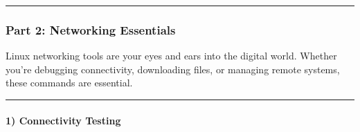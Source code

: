 \documentclass[
  english,
  paper=a4,
  oneside  ,captions=tableheading
]{scrartcl}
\newenvironment{Shaded}{}{}
\newcommand{\AttributeTok}[1]{\textcolor[rgb]{0.49,0.56,0.16}{#1}}
\newcommand{\BuiltInTok}[1]{\textcolor[rgb]{0.00,0.50,0.00}{#1}}
\newcommand{\CommentTok}[1]{\textcolor[rgb]{0.38,0.63,0.69}{\textit{#1}}}
\newcommand{\ExtensionTok}[1]{#1}
\newcommand{\KeywordTok}[1]{\textcolor[rgb]{0.00,0.44,0.13}{\textbf{#1}}}
\newcommand{\OperatorTok}[1]{\textcolor[rgb]{0.40,0.40,0.40}{#1}}
\newcommand{\StringTok}[1]{\textcolor[rgb]{0.25,0.44,0.63}{#1}}
\newcommand{\VariableTok}[1]{\textcolor[rgb]{0.10,0.09,0.49}{#1}}
\begin{document}
\begin{Shaded}
\end{Shaded}

\begin{center}\rule{0.5\linewidth}{0.5pt}\end{center}

\subsubsection{Part 2: Networking
Essentials}\label{part-2-networking-essentials}

Linux networking tools are your eyes and ears into the digital world.
Whether you're debugging connectivity, downloading files, or managing
remote systems, these commands are essential.

\begin{center}\rule{0.5\linewidth}{0.5pt}\end{center}

\paragraph{1) Connectivity Testing}\label{connectivity-testing}
\end{document}
